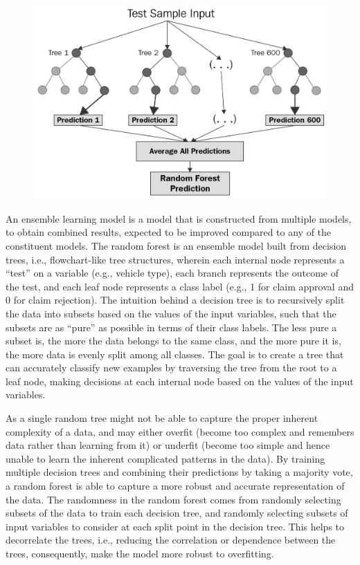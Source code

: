 \documentclass{article}
\begin{document}
\begin{figure}
\includegraphics[width=0.9\linewidth]{./figures/rf-model.png}
\end{figure}

An ensemble learning model is a model that is constructed from multiple
models, to obtain combined results, expected to be improved compared to
any of the constituent models. The random forest is an ensemble model
built from decision trees, i.e., flowchart-like tree structures, wherein
each internal node represents a ``test'' on a variable (e.g., vehicle
type), each branch represents the outcome of the test, and each leaf
node represents a class label (e.g., 1 for claim approval and 0 for
claim rejection). The intuition behind a decision tree is to recursively
split the data into subsets based on the values of the input variables,
such that the subsets are as ``pure'' as possible in terms of their
class labels. The less pure a subset is, the more the data belongs to
the same class, and the more pure it is, the more data is evenly split
among all classes. The goal is to create a tree that can accurately
classify new examples by traversing the tree from the root to a leaf
node, making decisions at each internal node based on the values of the
input variables.

As a single random tree might not be able to capture the proper inherent
complexity of a data, and may either overfit (become too complex and
remembers data rather than learning from it) or underfit (become too
simple and hence unable to learn the inherent complicated patterns in
the data). By training multiple decision trees and combining their
predictions by taking a majority vote, a random forest is able to
capture a more robust and accurate representation of the data. The
randomness in the random forest comes from randomly selecting subsets of
the data to train each decision tree, and randomly selecting subsets of
input variables to consider at each split point in the decision tree.
This helps to decorrelate the trees, i.e., reducing the correlation or
dependence between the trees, consequently, make the model more robust
to overfitting.
\end{document}
